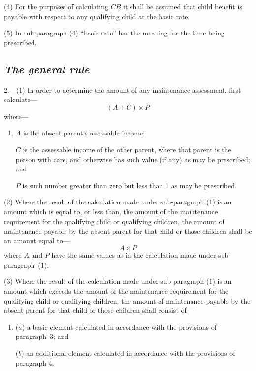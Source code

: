 \documentclass[12pt,a4paper]{article}
\begin{document}
(4) For the purposes of calculating $CB$ it shall be assumed that child benefit is payable with respect to any qualifying child at the basic rate.

(5) In sub-paragraph (4)  “basic rate” has the meaning for the time being prescribed.


\subsection*{\itshape The general rule}

2.---(1) In order to determine the amount of any maintenance assessment, first calculate—
\[
(A + C) \times P
\]
where—
\begin{enumerate}\item[]
    $A$ is the absent parent’s assessable income;

    $C$ is the assessable income of the other parent, where that parent is the person with care, and otherwise has such value (if any) as may be prescribed; and

    $P$ is such number greater than zero but less than 1 as may be prescribed. 
\end{enumerate}

(2) Where the result of the calculation made under sub-paragraph (1)  is an amount which is equal to, or less than, the amount of the maintenance requirement for the qualifying child or qualifying children, the amount of maintenance payable by the absent parent for that child or those children shall be an amount equal to—
\[
A \times P
\]
where $A$ and $P$ have the same values as in the calculation made under sub-paragraph~(1).

(3) Where the result of the calculation made under sub-paragraph (1)  is an amount which exceeds the amount of the maintenance requirement for the qualifying child or qualifying children, the amount of maintenance payable by the absent parent for that child or those children shall consist of—
\begin{enumerate}\item[]
($a$) a basic element calculated in accordance with the provisions of paragraph~3; and

($b$) an additional element calculated in accordance with the provisions of paragraph 4.
\end{enumerate}

\end{document}
